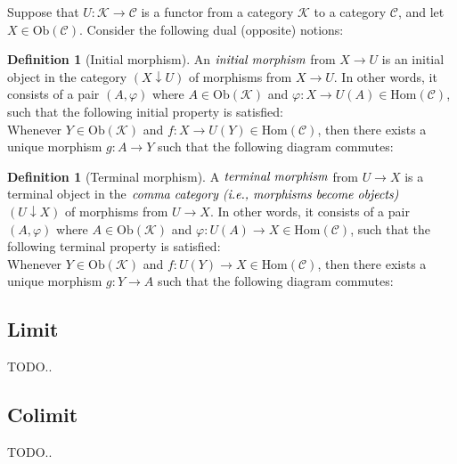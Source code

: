 \documentclass[10pt, oneside, reqno]{amsart}
\theoremstyle{plain}%
\theoremstyle{definition}
\newtheorem{defn}[thm]{Definition}
\theoremstyle{remark}
\begin{document}
Suppose that $U: \mathcal{K} \to \mathcal{C}$ is a functor from a category $\mathcal{K}$ to a category $\mathcal{C}$,
and let $X \in \text{Ob}(\mathcal{C})$. Consider the following dual (opposite) notions:
\begin{defn}[Initial morphism]
 An $\emph{initial morphism}$ from $X \to U$ is an initial object in the category
 $(X \downarrow U)$ of morphisms from $X \to U$. In other words, it consists
 of a pair $(A, \varphi)$ where $A \in \text{Ob}(\mathcal{K})$ and $\varphi: X \to U(A) \in \text{Hom}(\mathcal{C})$,
 such that the following initial property is satisfied:
 \\
 Whenever $Y \in \text{Ob}(\mathcal{K})$ and $f: X \to U(Y) \in \text{Hom}(\mathcal{C})$, then there exists a unique morphism
 $g: A \to Y$ such that the following diagram commutes:
\end{defn}

\begin{defn}[Terminal morphism]
 A $\emph{terminal morphism}$ from $U \to X$ is a terminal object in the $\emph{comma category (i.e., morphisms become objects)}$
 $(U \downarrow X)$ of morphisms from $U \to X$. In other words, it consists of a pair $(A, \varphi)$
 where $A \in \text{Ob}(\mathcal{K})$ and $\varphi: U(A) \to X \in \text{Hom}(\mathcal{C})$,
 such that the following terminal property is satisfied:
 \\
 Whenever $Y \in \text{Ob}(\mathcal{K})$ and $f: U(Y) \to X \in \text{Hom}(\mathcal{C})$, then there exists a unique morphism
 $g: Y \to A$ such that the following diagram commutes:
\end{defn}


\subsection{Limit} %
\label{subsec:limit}
TODO..

\subsection{Colimit} %
\label{subsec:colimit}
TODO..
\end{document}
